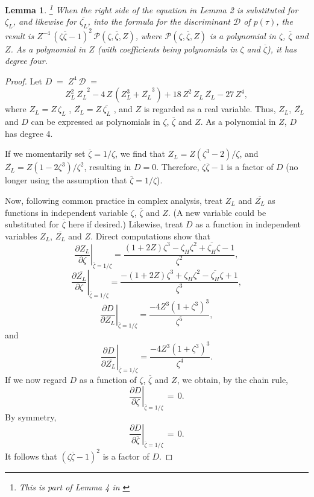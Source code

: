 \documentclass[a4paper, twoside]{article}
\newtheorem{lemma}{Lemma}
\begin{document}
\begin{lemma}\footnote{This is part of Lemma 4 in \cite{RW}}
When the right side of the equation in Lemma 2 is substituted for $\zeta_L$, and likewise for $\overline{\zeta_L}$, into the formula for the discriminant $\mathcal{D}$ of $p(\tau)$, the result is $Z^{-4} \, (\zeta \overline{\zeta} - 1)^2 \, \mathcal{P}(\zeta, \overline{\zeta}, Z)$, where $\mathcal{P}(\zeta, \overline{\zeta}, Z)$ is a polynomial in $\zeta$, $\overline{\zeta}$ and $Z$. As a polynomial in $Z$ (with coefficients being polynomials in $\zeta$ and $\overline{\zeta}$), it has degree four. 

\end{lemma}

\begin{proof}
Let $D \; = \; Z^4 \, \mathcal{D} \; =$  
$$Z_L^2 \, \overline{Z_L}^2 - 4 \, Z \, (Z_L^3 + \overline{Z_L}^3) + 18 \, Z^2 \, Z_L \, \overline{Z_L} - 27 \, Z^4,$$
where $Z_L = Z \, \zeta_L$ , $\overline{Z_L} = Z \, \overline{\zeta_L}$ , and $Z$ is regarded as a real variable. Thus, $Z_L$, $\overline{Z_L}$ and $D$ can be expressed as polynomials in $\zeta$, $\overline{\zeta}$ and $Z$. As a polynomial in $Z$, $D$ has degree 4. 

If we momentarily set $\overline{\zeta} = 1 / \zeta$, we find that $Z_L = Z (\zeta^3 - 2) / \zeta$, and $\overline{Z_L} = Z (1 - 2 \zeta^3) / \zeta^2$, resulting in $D = 0$. Therefore, $\zeta \overline{\zeta} - 1$ is a factor of $D$ (no longer using the assumption that $\overline{\zeta} = 1 / \zeta$). 

Now, following common practice in complex analysis, treat $Z_L$ and $\overline{Z_L}$ as functions in independent variable $\zeta$, $\overline{\zeta}$ and $Z$. (A new variable could be substituted for $\overline{\zeta}$ here if desired.) Likewise, treat $D$ as a function in independent variables $Z_L$, $\overline{Z_L}$ and $Z$. Direct computations show that 
$$\left. \frac{\partial Z_L}{\partial \zeta} \right|_{\overline{\zeta}=1/\zeta} = \frac{ (1+2Z)\zeta^3 - \zeta_H \zeta^2 + \overline{\zeta_H}\zeta - 1}  {\zeta^2} , $$ 
$$\left. \frac{\partial \overline{Z_L}}{\partial \zeta} \right|_{\overline{\zeta}=1/\zeta} = \frac{-(1+2Z)\zeta^3 + \zeta_H \zeta^2 - \overline{\zeta_H}\zeta + 1}  {\zeta^3} , $$ 
$$\left. \frac{\partial D}{\partial Z_L} \right|_{\overline{\zeta}=1/\zeta} = \frac{-4 Z^3 (1+\zeta^3)^3}  {\zeta^5} , $$ 
and
$$\left. \frac{\partial D}{\partial \overline{Z_L}} \right|_{\overline{\zeta}=1/\zeta} = \frac{-4 Z^3 (1+\zeta^3)^3}  {\zeta^4}. $$
If we now regard $D$ as a function of $\zeta$, $\overline{\zeta}$ and $Z$, we obtain, by the chain rule, 
$$\left. \frac{\partial D}{\partial \zeta} \right|_{\overline{\zeta}=1/\zeta} \, = \, 0.$$ 
By symmetry, 
$$\left. \frac{\partial D}{\partial \overline{\zeta}} \right|_{\overline{\zeta}=1/\zeta} \, = \, 0.$$ 
It follows that $(\zeta \overline{\zeta} - 1)^2$ is a factor of $D$. 
\end{proof} 
\end{document}
